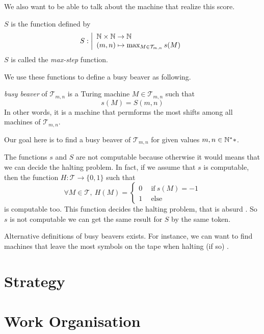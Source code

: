 \documentclass{report}
\begin{document}
We also want to be able to talk about the machine that realize this score.
\begin{Def}
$S$ is the function defined by
\[
S : \left |
  \begin{array}{l}
    \mathbb{N} \times \mathbb{N} \to \mathbb{N}\\
    (m,n) \mapsto \max_{M \in \mathcal{T}_{m,n}} s(M)
  \end{array}
\right .
\]
$S$ is called the \emph{max-step} function.
\end{Def}

We use these functions to define a busy beaver as following.

\begin{Def}
\emph{busy beaver} of $\mathcal{T}_{m,n}$ is a Turing machine $M \in \mathcal{T}_{m,n}$ such that \[s(M) = S(m,n)\] In other words, it is a machine that permforms the most shifts among all machines of $\mathcal{T}_{m,n}$.  
\end{Def}


Our goal here is to find a busy beaver of $\mathcal{T}_{m,n}$ for given values $m,n\in\mathbb{N}^**$.


\begin{Rem}
  The functions $s$ and $S$ are not computable because otherwise it would means that we can decide the halting problem. In fact, if we assume that $s$ is computable, then the function $H : \mathcal{T} \to \{0,1\}$ such that
  \[
  \forall M \in \mathcal{T},\ H(M) =
  \left \{
    \begin{array}{l}
      0\quad \ \text{if}\ s(M) = -1\\
      1\quad \ \text{else} 
    \end{array}
  \right .
  \]
  is computable too. This function decides the halting problem, that is absurd \cite{turing}. So $s$ is not computable we can get the same result for $S$ by the same token.
\end{Rem}

\begin{Rem}
  Alternative definitions of busy beavers exists. For instance, we can want to find machines that leave the most symbols on the tape when halting (if so) \cite{rado}.  
\end{Rem}

\chapter{Strategy}
\label{chap:strategy}

\chapter{Work Organisation}
\label{chap:wo}
\end{document}
